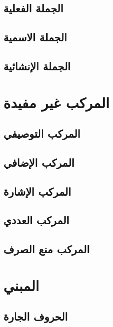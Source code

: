 \documentclass[11pt,twoside]{book}
\begin{document}
\section{الجملة الفعلية}


\section{الجملة الاسمية}


\section{الجملة الإنشائية}



\chapter{المركب غير مفيدة}


\section{المركب التوصيفي}


\section{المركب الإضافي}


\section{المركب الإشارة}


\section{المركب العددي}


\section{المركب منع الصرف}



\chapter{المبني}

\section{الحروف الجارة}

\end{document}
